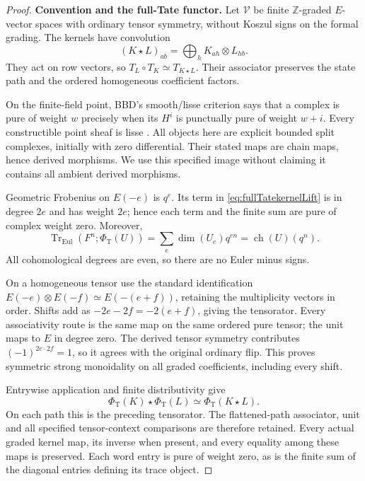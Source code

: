 \documentclass[11pt,a4paper]{article}
\theoremstyle{named}\newtheorem{finding}{Finding}[section]
\theoremstyle{definition}\newtheorem{definition}[finding]{Definition}
\theoremstyle{remark}\newtheorem{remark}[finding]{Remark}
\begin{document}
\begin{proof}
\par\smallskip\noindent\textbf{Convention and the full-Tate functor.}\quad
Let \(\mathcal V\) be finite \(\mathbb Z\)-graded \(E\)-vector
spaces with ordinary tensor symmetry, without Koszul signs on
the formal grading. The kernels have convolution
\[
 (K\star L)_{ab}=\bigoplus_h K_{ah}\otimes L_{hb}.
\]
They act on row vectors, so \(T_L\circ T_K\simeq T_{K\star L}\).
Their associator preserves the state path and the ordered
homogeneous coefficient factors.

On the finite-field point, BBD's smooth/lisse criterion says
that a complex is pure of weight \(w\) precisely when its
\(H^i\) is punctually pure of weight \(w+i\).
Every constructible point sheaf is lisse
\cite[5.1.5, pp.~125--126; 5.1.8, pp.~126--127]{BBD}.
All objects here are explicit bounded split complexes,
initially with zero differential. Their stated maps are
chain maps, hence derived morphisms. We use this specified
image without claiming it contains all ambient derived
morphisms.

Geometric Frobenius on \(E(-e)\) is \(q^e\).
Its term in \eqref{eq:fullTatekernelLift} is in degree \(2e\)
and has weight \(2e\); hence each term and the finite sum are
pure of complex weight zero. Moreover,
\begin{equation}\label{eq:fullTatekernelTrace}
 \operatorname{Tr}_{\mathrm{Eul}}(F^n;\Phi_{\mathrm T}(U))
   =\sum_e\dim(U_e)q^{en}
   =\operatorname{ch}(U)(q^n).
\end{equation}
All cohomological degrees are even, so there are no Euler
minus signs.

On a homogeneous tensor use the standard identification
\(E(-e)\otimes E(-f)\simeq E(-(e+f))\), retaining the
multiplicity vectors in order. Shifts add as
\(-2e-2f=-2(e+f)\), giving the tensorator.
Every associativity route is the same map on the same
ordered pure tensor; the unit maps to \(E\) in degree zero.
The derived tensor symmetry contributes
\((-1)^{2e\cdot2f}=1\), so it agrees with the original
ordinary flip. This proves symmetric strong monoidality
on all graded coefficients, including every shift.

Entrywise application and finite distributivity give
\[
 \Phi_{\mathrm T}(K)\star\Phi_{\mathrm T}(L)
       \simeq\Phi_{\mathrm T}(K\star L).
\]
On each path this is the preceding tensorator.
The flattened-path associator, unit and all specified
tensor-context comparisons are therefore retained.
Every actual graded kernel map, its inverse when present,
and every equality among these maps is preserved.
Each word entry is pure of weight zero, as is the finite
sum of the diagonal entries defining its trace object.


\end{proof}
\end{document}

